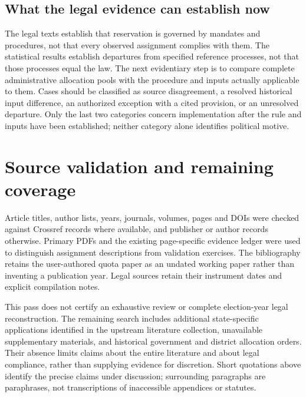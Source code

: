 \subsection{What the legal evidence can establish now}

The legal texts establish that reservation is governed by mandates and
procedures, not that every observed assignment complies with them. The statistical
results establish departures from specified reference processes, not that those
processes equal the law. The next evidentiary step is to compare complete
administrative allocation pools with the procedure and inputs actually applicable
to them. Cases should be classified as source disagreement, a resolved historical
input difference, an authorized exception with a cited provision, or an unresolved
departure. Only the last two categories concern implementation after the rule and
inputs have been established; neither category alone identifies political motive.

\section{Source validation and remaining coverage}

Article titles, author lists, years, journals, volumes, pages and DOIs were
checked against Crossref records where available, and publisher or author
records otherwise. Primary PDFs and the existing page-specific evidence ledger
were used to distinguish assignment descriptions from validation exercises.
The bibliography retains the user-authored quota paper as an undated working
paper rather than inventing a publication year. Legal sources retain their
instrument dates and explicit compilation notes.

This pass does not certify an exhaustive review or complete election-year legal
reconstruction. The remaining search includes additional state-specific
applications identified in the upstream literature collection, unavailable
supplementary materials, and historical government and district allocation
orders. Their absence limits claims about the entire literature and about legal
compliance, rather than supplying evidence for discretion. Short quotations
above identify the precise claims under discussion; surrounding paragraphs are
paraphrases, not transcriptions of inaccessible appendices or statutes.
